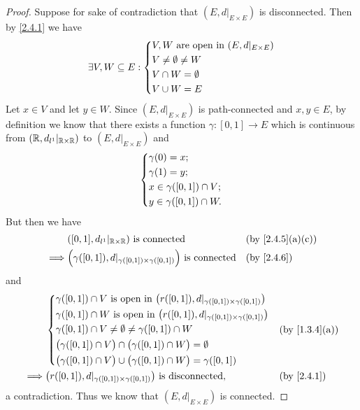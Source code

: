 \begin{proof}
  Suppose for sake of contradiction that \((E, d|_{E \times E})\) is disconnected.
  Then by \cref{2.4.1} we have
  \[
    \exists V, W \subseteq E : \begin{dcases}
      V, W \text{ are open in } (E, d|_{E \times E}) \\
      V \neq \emptyset \neq W                        \\
      V \cap W = \emptyset                           \\
      V \cup W = E
    \end{dcases}
  \]
  Let \(x \in V\) and let \(y \in W\).
  Since \((E, d|_{E \times E})\) is path-connected and \(x, y \in E\), by definition we know that there exists a function \(\gamma : [0, 1] \to E\) which is continuous from \((\mathbb{R}, d_{l^1}|_{\mathbb{R} \times \mathbb{R}})\) to \((E, d|_{E \times E})\) and
  \[
    \begin{dcases}
      \gamma(0) = x;               \\
      \gamma(1) = y;               \\
      x \in \gamma([0, 1]) \cap V; \\
      y \in \gamma([0, 1]) \cap W.
    \end{dcases}
  \]
  But then we have
  \begin{align*}
             & ([0, 1], d_{l^1}|_{\R \times \R}) \text{ is connected}                                   &  & \text{(by \cref{2.4.5}(a)(c))} \\
    \implies & \Big(\gamma([0, 1]), d|_{\gamma([0, 1]) \times \gamma([0, 1])}\Big) \text{ is connected} &  & \by{2.4.6}
  \end{align*}
  and
  \begin{align*}
             & \begin{dcases}
                 \gamma([0, 1]) \cap V \text{ is open in } \big(r([0, 1]), d|_{\gamma([0, 1]) \times \gamma([0, 1])}\big) \\
                 \gamma([0, 1]) \cap W \text{ is open in } \big(r([0, 1]), d|_{\gamma([0, 1]) \times \gamma([0, 1])}\big) \\
                 \gamma([0, 1]) \cap V \neq \emptyset \neq \gamma([0, 1]) \cap W                                          \\
                 \big(\gamma([0, 1]) \cap V\big) \cap \big(\gamma([0, 1]) \cap W\big) = \emptyset                         \\
                 \big(\gamma([0, 1]) \cap V\big) \cup \big(\gamma([0, 1]) \cap W\big) = \gamma([0, 1])
               \end{dcases} &  & \text{(by \cref{1.3.4}(a))}                    \\
    \implies & \big(r([0, 1]), d|_{\gamma([0, 1]) \times \gamma([0, 1])}\big) \text{ is disconnected},                                     &  & \by{2.4.1}
  \end{align*}
  a contradiction.
  Thus we know that \((E, d|_{E \times E})\) is connected.
\end{proof}

